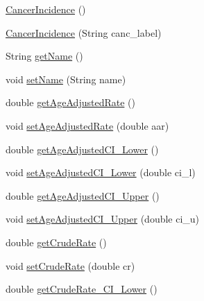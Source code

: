 \begin{DoxyCompactItemize}
\item 
\hyperlink{classbridges_1_1data__src__dependent_1_1_cancer_incidence_a92db1eb4292c77f07619019587caf5cc}{Cancer\+Incidence} ()
\item 
\hyperlink{classbridges_1_1data__src__dependent_1_1_cancer_incidence_a3db553c2769892563c3f1ebb033ba4c6}{Cancer\+Incidence} (String canc\+\_\+label)
\item 
String \hyperlink{classbridges_1_1data__src__dependent_1_1_cancer_incidence_ac7958f37807979cf06e712373f080b9a}{get\+Name} ()
\item 
void \hyperlink{classbridges_1_1data__src__dependent_1_1_cancer_incidence_a1aef58b128adfd1e2a31ab9726247e9e}{set\+Name} (String name)
\item 
double \hyperlink{classbridges_1_1data__src__dependent_1_1_cancer_incidence_a87bc1cbc5a72eb9b4df5ff7ab4843ae8}{get\+Age\+Adjusted\+Rate} ()
\item 
void \hyperlink{classbridges_1_1data__src__dependent_1_1_cancer_incidence_a26c2d63e8465bcfdab047129312b4897}{set\+Age\+Adjusted\+Rate} (double aar)
\item 
double \hyperlink{classbridges_1_1data__src__dependent_1_1_cancer_incidence_a7e5dab6d140f2a8e162c5d5c514c74c1}{get\+Age\+Adjusted\+C\+I\+\_\+\+Lower} ()
\item 
void \hyperlink{classbridges_1_1data__src__dependent_1_1_cancer_incidence_a4cd8ce7c68f00d2cd15928764cc32c09}{set\+Age\+Adjusted\+C\+I\+\_\+\+Lower} (double ci\+\_\+l)
\item 
double \hyperlink{classbridges_1_1data__src__dependent_1_1_cancer_incidence_ae7b71d91c3acae9fce3536f6a9d8362b}{get\+Age\+Adjusted\+C\+I\+\_\+\+Upper} ()
\item 
void \hyperlink{classbridges_1_1data__src__dependent_1_1_cancer_incidence_aeb386486bfbd96ba9ab689b7d95d4522}{set\+Age\+Adjusted\+C\+I\+\_\+\+Upper} (double ci\+\_\+u)
\item 
double \hyperlink{classbridges_1_1data__src__dependent_1_1_cancer_incidence_afc2ddb3099dffc46371ad7188278501d}{get\+Crude\+Rate} ()
\item 
void \hyperlink{classbridges_1_1data__src__dependent_1_1_cancer_incidence_a64a737fd7481262650efd596c508ffd6}{set\+Crude\+Rate} (double cr)
\item 
double \hyperlink{classbridges_1_1data__src__dependent_1_1_cancer_incidence_a8c410730b03abc78395e75b5024d495e}{get\+Crude\+Rate\+\_\+\+C\+I\+\_\+\+Lower} ()
\item 

\end{DoxyCompactItemize}
